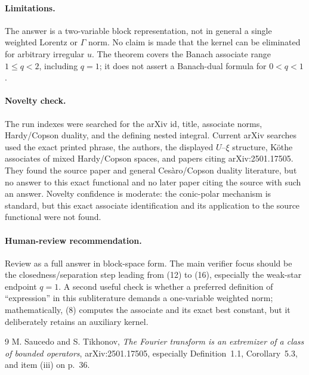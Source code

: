 \documentclass[11pt]{article}
\begin{document}
\paragraph{Limitations.}
The answer is a two-variable block representation, not in general a single
weighted Lorentz or $\Gamma$ norm.  No claim is made that the kernel can be
eliminated for arbitrary irregular $u$.  The theorem covers the Banach
associate range $1\le q<2$, including $q=1$; it does not assert a Banach-dual
formula for $0<q<1$.

\paragraph{Novelty check.}
\begin{sloppypar}
The run indexes were searched for the arXiv id, title, associate norms,
Hardy/Copson duality, and the defining nested integral.  Current arXiv
searches used the exact printed phrase, the authors, the displayed
$U$--$\xi$ structure, K\"othe associates of mixed Hardy/Copson spaces, and
papers citing arXiv:2501.17505.  They found the source paper and general
Ces\`aro/Copson duality literature, but no answer to this exact functional and
no later paper citing the source with such an answer.  Novelty confidence is
moderate: the conic-polar mechanism is standard, but this exact associate
identification and its application to the source functional were not found.
\end{sloppypar}

\paragraph{Human-review recommendation.}
Review as a full answer in block-space form.  The main verifier focus should
be the closedness/separation step leading from (12) to (16), especially the
weak-star endpoint $q=1$.  A second useful check is whether a preferred
definition of ``expression'' in this subliterature demands a one-variable
weighted norm; mathematically, (8) computes the associate and its exact best
constant, but it deliberately retains an auxiliary kernel.

\begin{thebibliography}{9}
M. Saucedo and S. Tikhonov,
\emph{The Fourier transform is an extremizer of a class of bounded operators},
arXiv:2501.17505, especially Definition~1.1, Corollary~5.3, and item (iii) on
p.~36.
\end{thebibliography}
\end{document}
